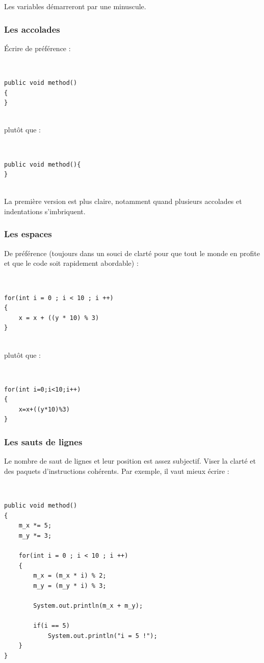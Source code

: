 \documentclass[11pt]{report}
\begin{document}
Les variables démarreront par une minuscule.

\subsubsection{Les accolades}

Écrire de préférence : 

~\
\begin{lstlisting}
public void method()
{
}
\end{lstlisting}

~\\
plutôt que :

~\
\begin{lstlisting}
public void method(){
}
\end{lstlisting}

~\\
La première version est plus claire, notamment quand plusieurs accolades et indentations s'imbriquent.

\subsubsection{Les espaces}

De préférence (toujours dans un souci de clarté pour que tout le monde en profite et que le code soit rapidement abordable) :

~\
\begin{lstlisting}
for(int i = 0 ; i < 10 ; i ++)
{
	x = x + ((y * 10) % 3)
}
\end{lstlisting}

~\\
plutôt que :

~\
\begin{lstlisting}
for(int i=0;i<10;i++)
{
	x=x+((y*10)%3)
}
\end{lstlisting}

\subsubsection{Les sauts de lignes}

Le nombre de saut de lignes et leur position est assez subjectif. Viser la clarté et des paquets d'instructions cohérents. Par exemple, il vaut mieux écrire :

~\
\begin{lstlisting}
public void method()
{
	m_x *= 5;
	m_y *= 3;
	
	for(int i = 0 ; i < 10 ; i ++)
	{
		m_x = (m_x * i) % 2;
		m_y = (m_y * i) % 3;
		
		System.out.println(m_x + m_y);
				
		if(i == 5)
			System.out.println("i = 5 !");
	}
}
\end{lstlisting}
\end{document}
